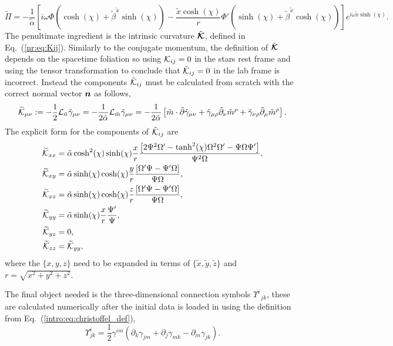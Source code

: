 \begin{equation} \widetilde{\Pi} = -\frac{1}{\tilde{\alpha}}\left[ i\omega \Phi \left( \cosh(\chi)+\tilde{\beta}^{\tilde{x}}\sinh(\chi)\right)- \frac{\tilde{x}\cosh(\chi)}{r}\Phi'\left( \sinh(\chi)+\tilde{\beta}^{\tilde{x}} \cosh(\chi)\right)  \right]e^{i\omega \tilde{x}\sinh(\chi)}.\end{equation}
The penultimate ingredient is the intrinsic curvature $\tilde{\boldsymbol{\mathcal{K}}}$, defined in Eq.~(\ref{nr:eq:Kij}). Similarly to the conjugate momentum, the definition of $\tilde{\boldsymbol{\mathcal{K}}}$ depends on the spacetime foliation so using ${\mathcal{K}}_{ij}=0$ in the stars rest frame and using the tensor transformation to conclude that $\tilde{\mathcal{K}}_{ij}=0$ in the lab frame is incorrect. Instead the components $\tilde{\mathcal{K}}_{ij}$ must be calculated from scratch with the correct normal vector $\boldsymbol{n}$ as follows,
\begin{equation} \widetilde{\mathcal{K}}_{\mu\nu} := -\frac{1}{2}\mathcal{L}_{\tilde{n}}\tilde{\gamma}_{\mu\nu} =-\frac{1}{2\tilde{\alpha}}\mathcal{L}_{\tilde{m}}\tilde{\gamma}_{\mu\nu} = -\frac{1}{2\tilde{\alpha}}\left[ \tilde m \cdot \tilde{\partial}\tilde{\gamma}_{\mu\nu} +  \tilde{\gamma}_{\mu\rho}\tilde{\partial}_\nu \tilde{m}^\rho +\tilde{\gamma}_{\nu\rho}\tilde{\partial}_\mu \tilde{m}^\rho\right].\end{equation}
The explicit form for the components of $\tilde{\mathcal{K}}_{ij}$ are
\begin{align} \widetilde{\mathcal{K}}_{xx} &= \tilde{\alpha}\cosh^2(\chi)\sinh(\chi)\frac{x }{r}\frac{ \left[2 \Psi^2 \Omega' -\tanh^2(\chi) \Omega^2 \Omega'-\Psi \Omega \Psi'\right]}{ \Psi^2 \Omega},\\
  \widetilde{\mathcal{K}}_{xy} &= \tilde{\alpha}\sinh(\chi)\cosh(\chi)\frac{y}{r}\frac{ \left[\Omega' \Psi- \Psi' \Omega\right]}{ \Psi \Omega },\\
  \widetilde{\mathcal{K}}_{xz} &= \tilde{\alpha}\sinh(\chi)\cosh(\chi)\frac{z}{r}\frac{  \left[\Omega' \Psi- \Psi' \Omega\right]}{ \Psi \Omega },\\
  \widetilde{\mathcal{K}}_{yy} &= \tilde{\alpha}\sinh(\chi)\frac{ x }{r}\frac{ \Psi'}{  \Psi },\\
 \widetilde{\mathcal{K}}_{yz}&=0,\\
\widetilde{\mathcal{K}}_{zz}&=\widetilde{\mathcal{K}}_{yy},\end{align}
where the $\{x,y,z\}$ need to be expanded in terms of $\{\tilde{x},  \tilde{y}, \tilde{z} \}$ and $r = \sqrt{x^2 + y^2 + z^2}$.

The final object needed is the three-dimensional connection symbols $\Upsilon^i_{\,\,\,jk}$, these are calculated numerically after the initial data is loaded in using the definition from Eq.~(\ref{intro:eq:christoffel_def}),
 \begin{equation}
\Upsilon^i_{jk} = \frac{1}{2}\gamma^{im}\left( \partial_k \gamma_{jm} +  \partial_j \gamma_{mk} -  \partial_m \gamma_{jk} \right).
 \end{equation}

